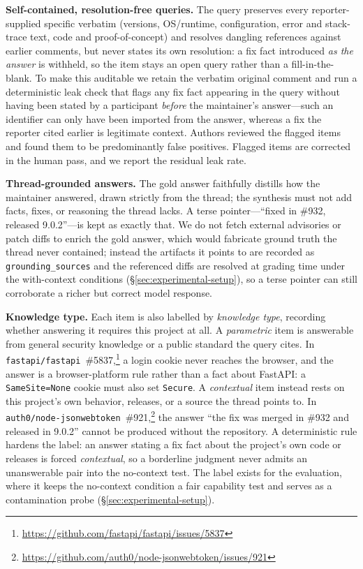 

\noindent\textbf{Self-contained, resolution-free queries.}
The query preserves every reporter-supplied specific verbatim (versions,
OS/runtime, configuration, error and stack-trace text, code and
proof-of-concept) and resolves dangling references against earlier comments, but
never states its own resolution: a fix fact introduced \emph{as the answer} is
withheld, so the item stays an open query rather than a fill-in-the-blank. To
make this auditable we retain the verbatim original comment and run a
deterministic leak check that flags any fix fact appearing in the query
without having been stated by a participant \emph{before} the maintainer's
answer---such an identifier can only have been imported from the answer, whereas
a fix the reporter cited earlier is legitimate context. Authors reviewed the
flagged items and found them to be predominantly false positives. Flagged items are
corrected in the human pass, and we report the residual leak rate.

\noindent\textbf{Thread-grounded answers.}
The gold answer faithfully distills how the maintainer answered, drawn strictly
from the thread; the synthesis must not add facts, fixes, or reasoning the thread
lacks. A terse pointer---``fixed in \#932, released 9.0.2''---is kept as exactly
that. We do not fetch external advisories or patch diffs to enrich the gold
answer, which would fabricate ground truth the thread never contained; instead
the artifacts it points to are recorded as \texttt{grounding\_sources} and the
referenced diffs are resolved at grading time under the with-context conditions
(\S\ref{sec:experimental-setup}), so a terse pointer can still corroborate a
richer but correct model response.

\noindent\textbf{Knowledge type.}
Each item is also labelled by \emph{knowledge type}, recording whether answering
it requires this project at all. A \emph{parametric} item is answerable from
general security knowledge or a public standard the query cites. In
\texttt{fastapi/fastapi}~\#5837,\footnote{\url{https://github.com/fastapi/fastapi/issues/5837}}
a login cookie never reaches the browser, and the answer is a browser-platform
rule rather than a fact about FastAPI: a \texttt{SameSite=None} cookie must also
set \texttt{Secure}. A \emph{contextual} item instead rests on this project's own
behavior, releases, or a source the thread points to. In
\texttt{auth0/node-jsonwebtoken}~\#921,\footnote{\url{https://github.com/auth0/node-jsonwebtoken/issues/921}}
the answer ``the fix was merged in \#932 and released in 9.0.2'' cannot be
produced without the repository. A deterministic rule hardens the label: an answer stating
a fix fact about the project's own code or releases is forced \emph{contextual},
so a borderline judgment never admits an unanswerable pair into the no-context
test. The label exists for the evaluation, where it keeps the no-context
condition a fair capability test and serves as a contamination probe
(\S\ref{sec:experimental-setup}).

